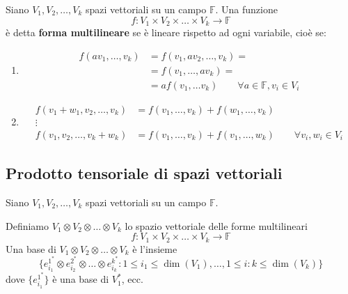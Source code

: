\documentclass[../main.tex]{subfiles}
\begin{document}
\begin{definition}
    Siano $V_1, V_2, \ldots, V_k$ spazi vettoriali su un campo $\mathbb{F}$. Una funzione
    \begin{equation*}
        f : V_1 \times V_2 \times \ldots \times V_k \rightarrow \mathbb{F}
    \end{equation*}
    è detta \textbf{forma multilineare} se è lineare rispetto ad ogni variabile, cioè se:
    \begin{enumerate}
        \item \begin{align*}
                  f(av_1, \ldots ,v_k) & = f(v_1, a v_2, \ldots, v_k) =                                      \\
                                       & = f(v_1, \ldots, a v_k) =                                           \\
                                       & = a f(v_1, \ldots v_k) \qquad \forall a \in \mathbb{F}, v_i \in V_i
              \end{align*}
        \item \begin{align*}
                  f(v_1 + w_1, v_2, \ldots ,v_k) & = f(v_1, \ldots, v_k) + f(w_1, \ldots, v_k)                                 \\
                  \vdots                         &                                                                             \\
                  f(v_1, v_2, \ldots ,v_k + w_k) & = f(v_1, \ldots, v_k) + f(v_1, \ldots, w_k) \qquad \forall v_i, w_i \in V_i
              \end{align*}
    \end{enumerate}
\end{definition}

\subsection{Prodotto tensoriale di spazi vettoriali}
\begin{definition}
    Siano $V_1, V_2, \ldots, V_k$ spazi vettoriali su un campo $\mathbb{F}$.

    Definiamo $V_1 \otimes V_2 \otimes \ldots \otimes V_k$ lo spazio vettoriale delle forme multilineari
    \begin{equation*}
        f : V_1 \times V_2 \times \ldots \times V_k \rightarrow \mathbb{F}
    \end{equation*}
    Una base di $V_1 \otimes V_2 \otimes \ldots \otimes V_k$ è l'insieme
    \begin{equation*}
        \{e_{i_1}^{1^*} \otimes e_{i_2}^{2^*} \otimes \ldots \otimes e_{i_k}^{k^*} : 1 \leq i_1 \leq \dim(V_1), \ldots , 1 \leq i:k \leq \dim(V_k)\}
    \end{equation*}
    dove $\{e_{i_1}^{1^*}\}$ è una base di $V_1^*$, ecc.
\end{definition}
\end{document}
